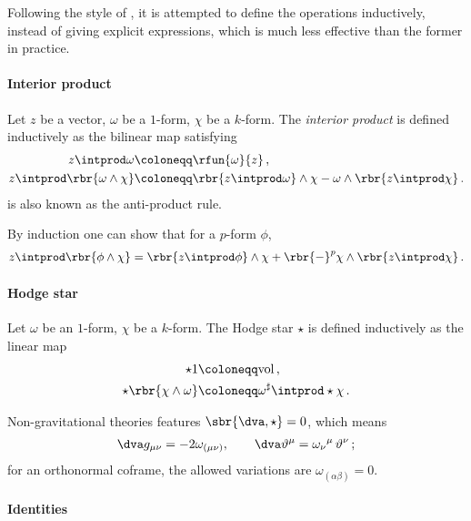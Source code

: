 \documentclass[a4paper]{article}
\begin{document}
Following the style of \cite[sec.\ 24]{Burke1985}, it is attempted to define 
the operations inductively, instead of giving explicit expressions, which is 
much less effective than the former in practice.

\paragraph{Interior product}

Let $z$ be a vector, $\omega$ be a $1$-form, $\chi$ be a $k$-form. 
The \emph{interior product} is defined inductively as the bilinear map
satisfying
\begin{align}
z \intprod \omega &\coloneqq \rfun{\omega}{z}\,, \\
z \intprod \rbr{\omega \wedge \chi} &\coloneqq
	\rbr{z\intprod\omega}\wedge \chi - \omega \wedge \rbr{z\intprod \chi}\,.
\label{eq:anti-prod-100}
\end{align}
 is also known as the anti-product rule.

By induction one can show that for a $p$-form $\phi$,
\begin{align}
z \intprod \rbr{\phi \wedge \chi} =
	\rbr{z\intprod\phi}\wedge \chi +
		\rbr{-}^{p} \chi \wedge \rbr{z\intprod \chi}\,.
\end{align}

\paragraph{Hodge star}

Let $\omega$ be an $1$-form, $\chi$ be a $k$-form. The Hodge star
$\star$ is defined inductively as the linear map 
\begin{align}
\star 1 &\coloneqq \mathrm{vol}\,, \\
\star\rbr{\chi\wedge\omega} &\coloneqq \omega^{\sharp} \intprod \star\chi\,.
\label{eq:hodge-100}
\end{align}

Non-gravitational theories features $\sbr{\dva, \star} = 0$, which means
\cite[sec.\ 3.2]{Muench1998}
\begin{align}
\dva g_{\mu\nu} = -2\omega_{(\mu\nu)},\qquad 
\dva\vartheta^{\mu} = \omega_{\nu}{}^{\mu}\,\vartheta^{\nu}\,;
\end{align}
for an orthonormal coframe, the allowed variations are 
$\omega_{(\alpha\beta)} = 0$.


\paragraph{Identities}
\end{document}
